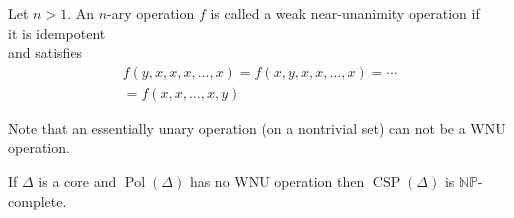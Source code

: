 \documentclass[12pt,xcolor=dvipsnames,handout
   ]{beamer}
\DeclareMathOperator{\CSP}{CSP}
\DeclareMathOperator{\Pol}{Pol}
\renewcommand{\.}{\cdot}
\newcommand{\NP}{\ensuremath{\mathbb{NP}}\xspace}
\let\emph=\alert
\begin{document}

\begin{frame}
  \begin{definition}
    Let $n>1$. An $n$-ary operation $f$ is called a \emph{weak
      near-unanimity operation} if \\
    \hspace*{1em} it is idempotent\\
    and satisfies
    \begin{multline*}
    f(y,x,x,x,\dots,x) = f(x,y,x,x,\dots,x) = \cdots\\
    = f(x,x,\dots,x,y)
  \end{multline*}
  \end{definition}

  \pause
  Note that an essentially unary operation (on a nontrivial set) can not
  be a WNU operation. 
\end{frame}

\begin{frame}
  \begin{theorem}
    If $\Delta$ is a core and $\Pol(\Delta)$ has no WNU operation
    then $\CSP(\Delta)$ is \NP-complete.    
  \end{theorem}

  
\end{frame}
\end{document}
